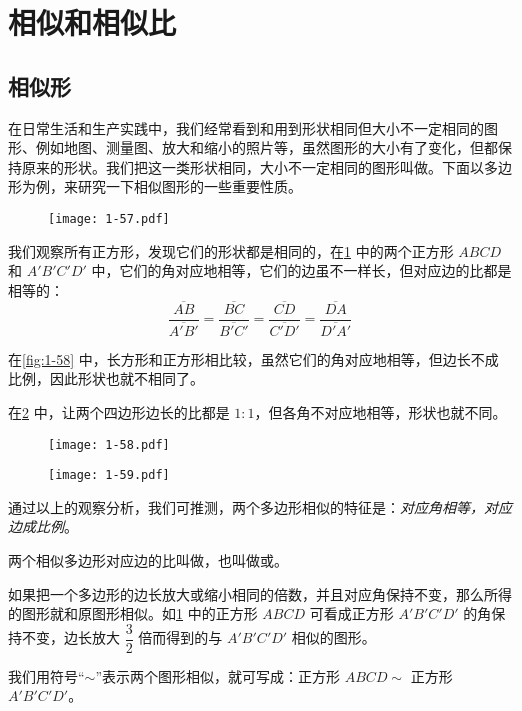 \section{相似和相似比}
\subsection{相似形}
在日常生活和生产实践中，我们经常看到和用到形状相同但大小不一定相同的图形、例如地图、测量图、放大和缩小的照片等，虽然图形的大小有了变化，但都保持原来的形状。我们把这一类形状相同，大小不一定相同的图形叫做。下面以多边形为例，来研究一下相似图形的一些重要性质。
\begin{figure}
  \texttt{[image: 1-57.pdf]}
	\caption{}\label{fig:1-57}
\end{figure}

我们观察所有正方形，发现它们的形状都是相同的，在\cref{fig:1-57} 中的两个正方形 $ABCD$ 和 $A'B'C'D'$ 中，它们的角对应地相等，它们的边虽不一样长，但对应边的比都是相等的：
\[\frac{\overline{AB}}{\overline{A'B'}}=\frac{\overline{BC}}{\overline{B'C'}}=\frac{\overline{CD}}{\overline{C'D'}}=\frac{\overline{DA}}{\overline{D'A'}}\]

在\cref{fig:1-58} 中，长方形和正方形相比较，虽然它们的角对应地相等，但边长不成比例，因此形状也就不相同了。

在\cref{fig:1-59} 中，让两个四边形边长的比都是 $1:1$，但各角不对应地相等，形状也就不同。
\begin{figure}
  \begin{minipage}[b]{0.48\linewidth}
    \centering
    \texttt{[image: 1-58.pdf]}
    \caption{}\label{fig:1-58}
  \end{minipage}
  \begin{minipage}[b]{0.48\linewidth}
    \centering
		\texttt{[image: 1-59.pdf]}
    \caption{}\label{fig:1-59}
  \end{minipage}
\end{figure}

通过以上的观察分析，我们可推测，两个多边形相似的特征是：\emph{对应角相等，对应边成比例}。

两个相似多边形对应边的比叫做，也叫做或。

如果把一个多边形的边长放大或缩小相同的倍数，并且对应角保持不变，那么所得的图形就和原图形相似。如\cref{fig:1-57} 中的正方形 $ABCD$ 可看成正方形 $A'B'C'D'$ 的角保持不变，边长放大 $\dfrac{3}{2}$ 倍而得到的与 $A'B'C'D'$ 相似的图形。

\medskip
我们用符号“$\sim$”表示两个图形相似，就可写成：正方形 $ABCD\sim$ 正方形 $A'B'C'D'$。

